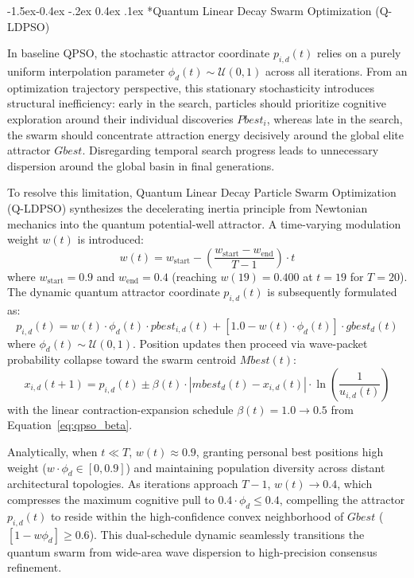 \documentclass[10pt]{article}
\makeatletter
\renewcommand\subsubsection{\@startsection{subsubsection}{3}{\z@}%
                                     {-1.5ex\@plus -0.4ex \@minus -.2ex}%
                                     {0.4ex \@plus .1ex}%
                                     {\normalfont\itshape\fontsize{7.8pt}{10.0pt}\selectfont}}
\makeatother
\begin{document}
\subsubsection*{Quantum Linear Decay Swarm Optimization (Q-LDPSO)}

In baseline QPSO, the stochastic attractor coordinate $p_{i,d}(t)$ relies on a purely uniform interpolation parameter $\phi_d(t) \sim \mathcal{U}(0, 1)$ across all iterations. From an optimization trajectory perspective, this stationary stochasticity introduces structural inefficiency: early in the search, particles should prioritize cognitive exploration around their individual discoveries $Pbest_i$, whereas late in the search, the swarm should concentrate attraction energy decisively around the global elite attractor $Gbest$. Disregarding temporal search progress leads to unnecessary dispersion around the global basin in final generations.

To resolve this limitation, Quantum Linear Decay Particle Swarm Optimization (Q-LDPSO) synthesizes the decelerating inertia principle from Newtonian mechanics into the quantum potential-well attractor. A time-varying modulation weight $w(t)$ is introduced:
\begin{equation}
w(t) = w_{\mathrm{start}} - \left( \frac{w_{\mathrm{start}} - w_{\mathrm{end}}}{T - 1} \right) \cdot t \label{eq:qldpso_w}
\end{equation}
where $w_{\mathrm{start}} = 0.9$ and $w_{\mathrm{end}} = 0.4$ (reaching $w(19) = 0.400$ at $t=19$ for $T=20$). The dynamic quantum attractor coordinate $p_{i,d}(t)$ is subsequently formulated as:
\begin{equation}
p_{i,d}(t) = w(t) \cdot \phi_d(t) \cdot pbest_{i,d}(t) + [1.0 - w(t) \cdot \phi_d(t)] \cdot gbest_d(t) \label{eq:qldpso_attractor}
\end{equation}
where $\phi_d(t) \sim \mathcal{U}(0, 1)$. Position updates then proceed via wave-packet probability collapse toward the swarm centroid $Mbest(t)$:
\begin{equation}
x_{i,d}(t+1) = p_{i,d}(t) \pm \beta(t) \cdot |mbest_d(t) - x_{i,d}(t)| \cdot \ln\left( \frac{1}{u_{i,d}(t)} \right) \label{eq:qldpso_pos}
\end{equation}
with the linear contraction-expansion schedule $\beta(t) = 1.0 \to 0.5$ from Equation~\eqref{eq:qpso_beta}.

Analytically, when $t \ll T$, $w(t) \approx 0.9$, granting personal best positions high weight ($w \cdot \phi_d \in [0, 0.9]$) and maintaining population diversity across distant architectural topologies. As iterations approach $T-1$, $w(t) \to 0.4$, which compresses the maximum cognitive pull to $0.4 \cdot \phi_d \le 0.4$, compelling the attractor $p_{i,d}(t)$ to reside within the high-confidence convex neighborhood of $Gbest$ ($[1 - w\phi_d] \ge 0.6$). This dual-schedule dynamic seamlessly transitions the quantum swarm from wide-area wave dispersion to high-precision consensus refinement.
\end{document}
